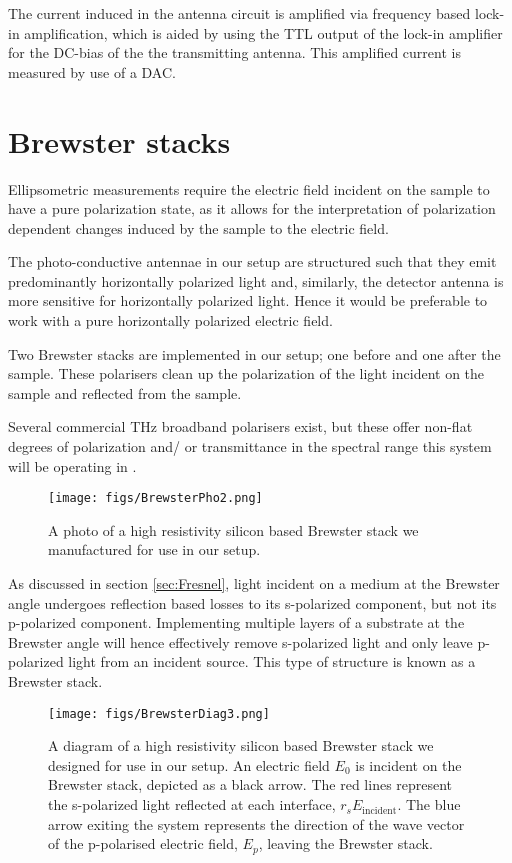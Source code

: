 The current induced in the antenna circuit is amplified via frequency based lock-in amplification, which is aided by using the TTL output of the lock-in amplifier for the DC-bias of the the transmitting antenna. This amplified current is measured by use of a DAC.

\section{Brewster stacks}
\label{sec: Brew}
Ellipsometric measurements require the electric field incident on the sample to have a pure polarization state, as it allows for the interpretation of polarization dependent changes induced by the sample to the electric field.

The photo-conductive antennae in our setup are structured such that they emit predominantly horizontally polarized light and, similarly, the detector antenna is more sensitive for horizontally polarized light. Hence it would be preferable to work with a pure horizontally polarized electric field.

Two Brewster stacks are implemented in our setup; one before and one after the sample. These polarisers clean up the polarization of the light incident on the sample and reflected from the sample.

Several commercial THz broadband polarisers exist, but these offer non-flat degrees of polarization and/ or transmittance in the spectral range this system will be operating in \cite{TyPol2019}.

\begin{figure}[H]
\begin{center}
	 \texttt{[image: figs/BrewsterPho2.png]}
	 \caption[Brewster stack photo]{A photo of a high resistivity silicon based Brewster stack we manufactured for use in our setup.}
   \label{fig:BrewPho}
\end{center}
\end{figure}

As discussed in section \ref{sec:Fresnel}, light incident on a medium at the Brewster angle undergoes reflection based losses to its s-polarized component, but not its p-polarized component. 
Implementing multiple layers of a substrate at the Brewster angle will hence effectively remove s-polarized light and only leave p-polarized light from an incident source. This type of structure is known as a Brewster stack.

\begin{figure}[H]
\begin{center}
	 \texttt{[image: figs/BrewsterDiag3.png]}
	 \caption[Brewster stack diagram]{A diagram of a high resistivity silicon based Brewster stack we designed for use in our setup. An electric field $E_{0}$ is incident on the Brewster stack, depicted as a black arrow. The red lines represent the s-polarized light reflected at each interface, $r_{s}E_{\text{incident}}$. The blue arrow exiting the system represents the direction of the wave vector of the p-polarised electric field, $E_{p}$, leaving the Brewster stack.}
   \label{fig:BrewDia}
\end{center}
\end{figure}

